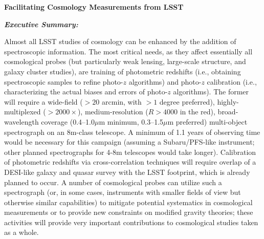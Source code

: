 \documentclass[12pt]{report}
\begin{document}
\pagestyle{fancy}
\fancyfoot{}%
\fancyfoot[R]{\thepage}  %

\fancyhead[R]{}
\renewcommand{\footrulewidth}{1pt}


\begin{centering}
{\huge{\bf{{Facilitating Cosmology Measurements from LSST}}}}


{\it{\bf Executive Summary:}}
\end{centering}
%

Almost all LSST studies of cosmology can be enhanced by the addition of spectroscopic information.   The most critical needs, as they affect essentially all cosmological probes (but particularly weak lensing, large-scale structure, and galaxy cluster studies), are training of photometric redshifts (i.e., obtaining spectroscopic samples to refine photo-$z$ algorithms) and photo-$z$ calibration (i.e., characterizing the actual biases and errors of photo-$z$ algorithms).  The former will require a wide-field ($>20$ arcmin, with $>1$ degree preferred), highly-multiplexed ($>2000\times$), medium-resolution ($R>4000$ in the red), broad-wavelength coverage (0.4--1.0$\mu$m minimum, 0.3--1.5$\mu$m preferred) multi-object spectrograph on an 8m-class telescope.  A minimum of 1.1 years of observing time would be necessary for this campaign (assuming a Subaru/PFS-like instrument; other planned spectrographs for 4-8m telescopes would take longer). Calibration of photometric redshifts via cross-correlation techniques will require overlap of a DESI-like galaxy and quasar survey with the LSST footprint, which is already planned to occur.  A number of cosmological probes can utilize such a spectrograph (or, in some cases, instruments with smaller fields of view but otherwise similar capabilities) to mitigate potential systematics in cosmological measurements or to provide new constraints on modified gravity theories; these activities will provide very important contributions to cosmological studies taken as a whole.
\end{document}
